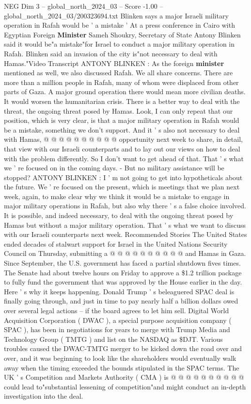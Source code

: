 \begin{textsample}{NEG Dim 3 – global\_north\_2024\_03 – Score -1.00 – global\_north\_2024\_03/200323694.txt}  \label{ex:f3_neg_185}
Blinken says a major Israeli military operation in Rafah would be ' a mistake ' At a press conference in Cairo with Egyptian Foreign \textbf{Minister} Sameh Shoukry, Secretary of State Antony Blinken said it would be"a mistake"for Israel to conduct a major military operation in Rafah.
Blinken said an invasion of the city is"not necessary to deal with Hamas."Video Transcript ANTONY BLINKEN : As the foreign \textbf{minister} mentioned as well, we also discussed Rafah.
We all share concerns.
There are more than a million people in Rafah, many of whom were displaced from other parts of Gaza.
A major ground operation there would mean more civilian deaths.
It would worsen the humanitarian crisis.
There is a better way to deal with the threat, the ongoing threat posed by Hamas.
Look, I can only repeat that our position, which is very clear, is that a major military operation in Rafah would be a mistake, something we don't support.
And it ' s also not necessary to deal with Hamas, @ @ @ @ @ @ @ @ @ @ opportunity next week to share, in detail, that view with our Israeli counterparts and to lay out our views on how to deal with the problem differently.
So I don't want to get ahead of that.
That ' s what we ' re focused on in the coming days. - But no military assistance will be stopped?
ANTONY BLINKEN : I ' m not going to get into hypotheticals about the future.
We ' re focused on the present, which is meetings that we plan next week, again, to make clear why we think it would be a mistake to engage in major military operations in Rafah, but also why there ' s a false choice involved.
It is possible, and indeed necessary, to deal with the ongoing threat posed by Hamas but without a major military operation.
That ' s what we want to discuss with our Israeli counterparts next week.
Recommended Stories The United States ended decades of stalwart support for Israel in the United Nations Security Council on Thursday, submitting a @ @ @ @ @ @ @ @ @ @ and Hamas in Gaza.
Since September, the U.S. government has faced a partial shutdown fives times.
The Senate had about twelve hours on Friday to approve a \$1.2 trillion package to fully fund the government that was approved by the House earlier in the day.
Here ' s why it keeps happening.
Donald Trump ' s beleaguered SPAC deal is finally going through, and just in time to pay nearly half a billion dollars owed over several legal actions -- if the board agrees to let him sell.
Digital World Acquisition Corporation ( DWAC ), a special purpose acquisition company ( SPAC ), has been in negotiations for years to merge with Trump Media and Technology Group ( TMTG ) and list on the NASDAQ as \$DJT.
Various troubles caused the DWAC-TMTG merger to be kicked down the road over and over, and it was beginning to look like the shareholders would eventually walk away when the timing exceeded the bounds stipulated in the SPAC terms.
The UK ' s Competition and Markets Authority ( CMA ) is @ @ @ @ @ @ @ @ @ @ could lead to"substantial lessening of competition"and might conduct an in-depth investigation into the deal.

\end{textsample}
